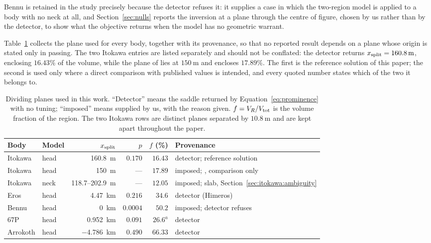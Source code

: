 Bennu is retained in the study precisely because
the detector refuses it: it supplies a case in which the two-region model
is applied to a body with no neck at all, and Section~\ref{sec:nulls}
reports the inversion at a plane through the centre of figure, chosen by
us rather than by the detector, to show what the objective returns when
the model has no geometric warrant.

Table~\ref{tab:planes} collects the plane used for every body, together
with its provenance, so that no reported result depends on a plane whose
origin is stated only in passing. The two Itokawa entries are listed
separately and should not be conflated: the detector returns
$x_{\mathrm{split}} = \SI{160.8}{\metre}$, enclosing $16.43\%$ of the volume, while
the plane of \citet{kanamaru2019} lies at $\SI{150}{\metre}$ and encloses
$17.89\%$. The first is the reference solution of this paper; the second
is used only where a direct comparison with published values is intended,
and every quoted number states which of the two it belongs to.

\begin{table}[htbp]
\centering
\small
\caption{Dividing planes used in this work. ``Detector'' means the saddle
returned by Equation~\eqref{eq:prominence} with no tuning; ``imposed''
means supplied by us, with the reason given. $f = V_{R}/V_{\mathrm{tot}}$ is the
volume fraction of the region. The two Itokawa rows are distinct planes
separated by $\SI{10.8}{\metre}$ and are kept apart throughout the paper.}
\label{tab:planes}
\setlength{\tabcolsep}{4pt}
\begin{tabular}{llrrrl}
\toprule
Body & Model & $x_{\mathrm{split}}$ & $p$ & $f$ (\%) & Provenance \\
\midrule
Itokawa  & head & \SI{160.8}{\metre}      & $0.170$  & $16.43$ & detector; reference solution \\
Itokawa  & head & \SI{150}{\metre}        & ---      & $17.89$ & imposed; \citet{kanamaru2019}, comparison only \\
Itokawa  & neck & \SI{118.7}{}--\SI{202.9}{\metre} & ---   & $12.05$ & imposed; slab, Section~\ref{sec:itokawa:ambiguity} \\
Eros     & head & \SI{+4.47}{\kilo\metre} & $0.216$  & $34.6$  & detector (Himeros) \\
Bennu    & head & \SI{0}{\kilo\metre}    & $0.0004$ & $50.2$  & imposed; detector refuses \\
67P      & head & \SI{+0.952}{\kilo\metre} & $0.091$  & $26.6^{a}$  & detector \\
Arrokoth & head & \SI{-4.786}{\kilo\metre} & $0.490$  & $66.33$ & detector \\
\bottomrule
\end{tabular}
\end{table}
\par{}

